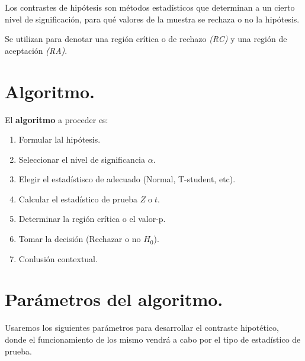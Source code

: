 \documentclass[a4paper,12pt]{article} %
\begin{document}
\begin{justify}
Los contrastes de hipótesis son métodos estadísticos que determinan a un cierto nivel de significación, para qué valores de la muestra se rechaza o no la hipótesis.
\end{justify}
\begin{justify}
    Se utilizan para denotar una región crítica o de rechazo \textit{(RC)} y una región de aceptación \textit{(RA)}. \cite{Introductory-statistics}
\end{justify}

\vspace{\baselineskip}

\section{Algoritmo.}

\begin{justify}
    El \textbf{algoritmo} a proceder es:
\end{justify}

\begin{enumerate}
    \item Formular lal hipótesis.
    \item Seleccionar el nivel de significancia \( \alpha.\)
    \item Elegir el estadístisco de adecuado (Normal, T-student, etc).
    \item Calcular el estadístico de prueba \(Z \; \text{o} \; t\).
    \item Determinar la región crítica o el valor-p.
    \item Tomar la decisión (Rechazar o no \(H_0\)).
    \item Conlusión contextual.
\end{enumerate}

\vspace{\baselineskip}

\section{Parámetros del algoritmo.}

\vspace{\baselineskip}

\begin{justify}
    Usaremos los siguientes parámetros para desarrollar el contraste hipotético,
    donde el funcionamiento de los mismo vendrá a cabo por el tipo de estadístico de prueba. 
\end{justify}
\end{document}
